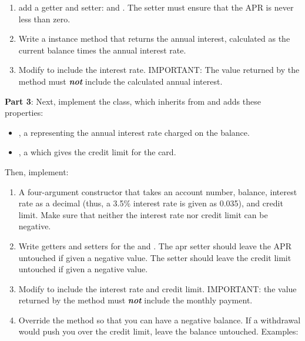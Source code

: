\begin{exercise}
\begin{enumerate}
\item add a getter and setter:  and . The setter must ensure that the APR is never less than zero.

\item Write a  instance method that returns the annual interest, calculated as the current balance times the annual interest rate.

\item Modify  to include the interest rate. IMPORTANT: The value returned by the  method must {\bf {\em not}} include the calculated annual interest.
\end{enumerate}

{\bf Part 3}: Next, implement the  class, which inherits from  and adds these  properties:

\begin{itemize}
\item {}, a  representing the annual interest rate charged on the balance.
\item {}, a  which gives the credit limit for the card.
\end{itemize}

Then, implement:
\begin{enumerate}
\item A four-argument constructor that takes an account number, balance, interest rate as a decimal (thus, a 3.5\% interest rate is given as 0.035), and credit limit. Make sure that neither the interest rate nor credit limit can be negative.

\item Write getters and setters for the  and . The apr setter should leave the APR untouched if given a negative value. The  setter should leave the credit limit untouched if given a negative value.

\item Modify  to include the interest rate and credit limit. IMPORTANT: the value returned by the  method must {\bf {\em not}} include the monthly payment.

\item Override the  method so that you can have a negative balance. If a withdrawal would push you over the credit limit, leave the balance untouched. Examples:


\end{enumerate}
\end{exercise}
